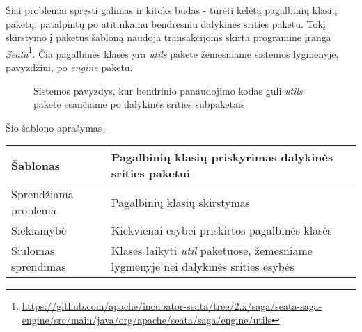 Šiai problemai spręsti galimas ir kitoks būdas - turėti keletą pagalbinių klasių paketų, patalpintų po atitinkamu bendresniu dalykinės srities
 paketu.
Tokį skirstymo į paketus šabloną naudoja transakcijoms skirta programinė įranga \textit{Seata}\footnote{\url{https://github.com/apache/incubator-seata/tree/2.x/saga/seata-saga-engine/src/main/java/org/apache/seata/saga/engine/utils}}.
Čia pagalbinės klasės yra \textit{utils} pakete žemesniame sistemos lygmenyje, pavyzdžiui, po \textit{engine} paketu.
\begin{figure}[H]
    \snugshade
    \endsnugshade
    \caption{Sistemos pavyzdys, kur bendrinio panaudojimo kodas guli \textit{utils} pakete esančiame po dalykinės srities subpaketais}
\end{figure}
Šio šablono aprašymas -
\begin{center}
    \begin{tabular}{|p{5cm}|p{10cm}|}
        \hline
        Šablonas &  Pagalbinių klasių priskyrimas dalykinės srities paketui \\ [0.5ex]
        \hline\hline
        Sprendžiama problema & Pagalbinių klasių skirstymas\\
        \hline
        Siekiamybė &  Kiekvienai esybei priskirtos pagalbinės klasės\\
        \hline
        Siūlomas sprendimas & Klases laikyti \textit{util} paketuose, žemesniame lygmenyje nei dalykinės srities esybės \\
        \hline
    \end{tabular}
\end{center}

